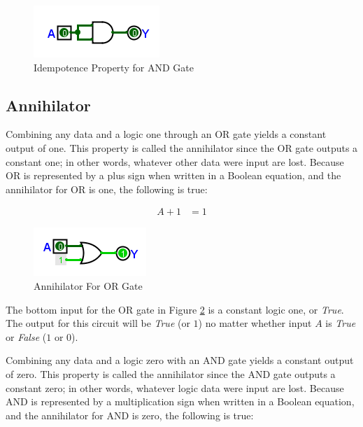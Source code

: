 \begin{figure}[H]
	\centering
	\includegraphics[width=\maxwidth{.95\linewidth}]{gfx/04_13}
	\caption{Idempotence Property for AND Gate}
	\label{fig:04_13}
\end{figure}

\subsection{Annihilator}
\label{BF:subsec:annihilator}

Combining any data and a logic one through an \textsf{OR} gate yields a constant output of one. This property is called the annihilator since the \textsf{OR} gate outputs a constant one; in other words, whatever other data were input are lost. Because \textsf{OR} is represented by a plus sign when written in a Boolean equation, and the annihilator for \textsf{OR} is one, the following is true:

\begin{align}
  \label{BF:eq:annihilator_or}
  A + 1 &= 1 
\end{align}

\begin{figure}[H]
	\centering
	\includegraphics[width=\maxwidth{.95\linewidth}]{gfx/04_14}
	\caption{Annihilator For OR Gate}
	\label{fig:04_14}
\end{figure}

The bottom input for the \textsf{OR}  gate in Figure \ref{fig:04_14} is a constant logic one, or \emph{True}. The output for this circuit will be \emph{True} (or $ 1 $) no matter whether input $ A $ is \emph{True} or \emph{False} ($ 1 $ or $ 0 $).

Combining any data and a logic zero with an \textsf{AND} gate yields a constant output of zero. This property is called the annihilator since the \textsf{AND}  gate outputs a constant zero; in other words, whatever logic data were input are lost. Because \textsf{AND}  is represented by a multiplication sign when written in a Boolean equation, and the annihilator for \textsf{AND} is zero, the following is true:

